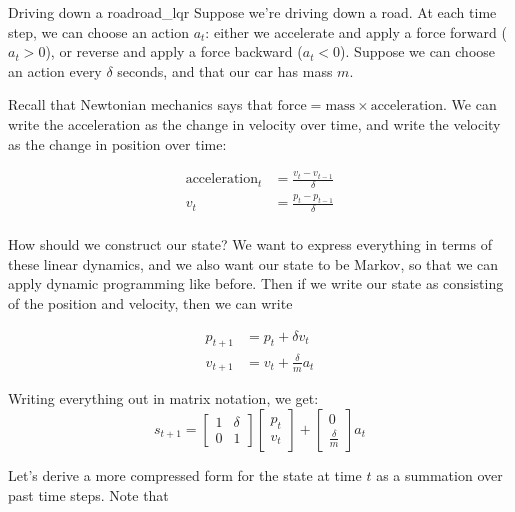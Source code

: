 \documentclass[../main/main]{subfiles}
\begin{document}
\begin{example}{Driving down a road}{road_lqr}
    Suppose we're driving down a road. At each time step, we can choose an
    action $a_t$: either we accelerate and apply a force forward ($a_t > 0$),
    or reverse and apply a force backward ($a_t < 0$).
    Suppose we can choose an action every $\delta$ seconds, and that our car
    has mass $m$.

    Recall that Newtonian mechanics says that $\text{force} = \text{mass} \times \text{acceleration}$. We can write the acceleration as the change in velocity
    over time, and write the velocity as the change in position over time:

    \begin{align*}
        \text{acceleration}_t &= \frac{v_t - v_{t-1}}{\delta} \\
        v_t &= \frac{p_t - p_{t-1}}{\delta} \\
    \end{align*}

    How should we construct our state? We want to express everything in terms
    of these linear dynamics, and we also want our state to be Markov, so that
    we can apply dynamic programming like before.
    Then if we write our state as consisting of the position and velocity, then
    we can write

    \begin{align*}
        p_{t+1} &= p_t  + \delta v_t \\
        v_{t+1} &= v_t + \frac{\delta}{m} a_t
    \end{align*}

    Writing everything out in matrix notation, we get: \[
        s_{t+1} = \begin{bmatrix}
            1 & \delta \\
            0 & 1
        \end{bmatrix} \begin{bmatrix}
            p_t \\ v_t
        \end{bmatrix}
        +
        \begin{bmatrix}
            0 \\ \frac{\delta}{m}
        \end{bmatrix}
        a_t
    \]
\end{example}


Let's derive a more compressed form for the state at time $t$ as a summation
over past time steps. Note that
\end{document}
